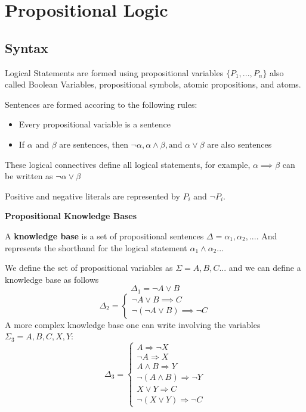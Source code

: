 \documentclass[11pt]{article}
\begin{document}
\section{Propositional Logic}
\subsection{Syntax}

Logical Statements are formed using propositional variables $\{P_1,...,P_n\}$ also called Boolean Variables, propositional symbols, atomic propositions, and atoms.
\vspace{1em}

Sentences are formed accoring to the following rules:

\begin{itemize}
    \item Every propositional variable is a sentence
    \item If $\alpha$ and $\beta$ are sentences, then $\lnot \alpha, \alpha \land \beta, \text{and } \alpha \lor \beta$ are also sentences
\end{itemize}

These logical connectives define all logical statements, for example, $\alpha \implies \beta$ can be written as $\lnot \alpha \lor \beta$
\vspace{1em}

Positive and negative literals are represented by $P_i$ and $\lnot P_i$.
\vspace{3em}

\textbf{\Large{Propositional Knowledge Bases}}
\vspace{1em}

A \textbf{knowledge base} is a set of propositional sentences $\Delta  = \alpha_1,\alpha_2,...$. And represents the shorthand for the logical statement $\alpha_1 \land \alpha_2 ...$
\vspace{1em}

We define the set of propositional variables as $\Sigma = A,B,C...$ and we can define a knowledge base as follows
$$\Delta_1 = \lnot A \lor B$$
$$
\Delta_2 = \begin{cases}
\lnot A \lor B \implies C\\
\lnot (\lnot A \lor B) \implies \lnot C
\end{cases}
$$
A more complex knowledge base one can write involving the variables $\Sigma_3 = A,B,C,X,Y$:
$$\Delta_3 = \begin{cases}
    A \Rightarrow \lnot X\\
    \lnot A \Rightarrow X\\
    A \land B \Rightarrow Y\\
    \lnot (A \land B) \Rightarrow \lnot Y\\
    X \lor Y \Rightarrow C\\
    \lnot (X \lor Y) \Rightarrow \lnot C
    \end{cases}
$$
\vspace{1em}
\end{document}

